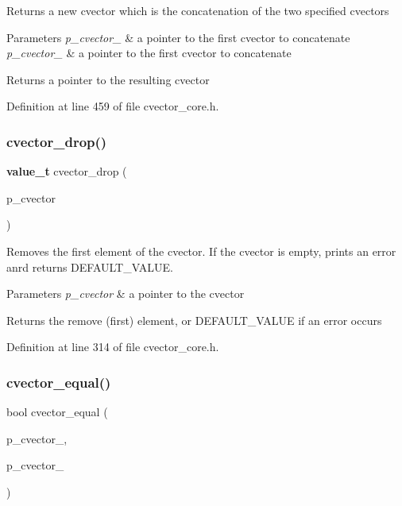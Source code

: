 Returns a new cvector which is the concatenation of the two specified cvectors 
\begin{DoxyParams}{Parameters}
{\em p\+\_\+cvector\+\_} & a pointer to the first cvector to concatenate \\
\hline
{\em p\+\_\+cvector\+\_} & a pointer to the first cvector to concatenate \\
\hline
\end{DoxyParams}
\begin{DoxyReturn}{Returns}
a pointer to the resulting cvector 
\end{DoxyReturn}


Definition at line 459 of file cvector\+\_\+core.\+h.

\mbox{\label{cvector__interface_8h_aa1f74a774799a6190e0f63e46fd034ad}} 
\subsubsection{cvector\+\_\+drop()}
{\footnotesize\ttfamily \textbf{ value\+\_\+t} cvector\+\_\+drop (\begin{DoxyParamCaption}\item[{\textbf{ cvector} $\ast$}]{p\+\_\+cvector }\end{DoxyParamCaption})}

Removes the first element of the cvector. If the cvector is empty, prints an error anrd returns D\+E\+F\+A\+U\+L\+T\+\_\+\+V\+A\+L\+UE. 
\begin{DoxyParams}{Parameters}
{\em p\+\_\+cvector} & a pointer to the cvector \\
\hline
\end{DoxyParams}
\begin{DoxyReturn}{Returns}
the remove (first) element, or D\+E\+F\+A\+U\+L\+T\+\_\+\+V\+A\+L\+UE if an error occurs 
\end{DoxyReturn}


Definition at line 314 of file cvector\+\_\+core.\+h.

\mbox{\label{cvector__interface_8h_aa0027f2467c3f04fb382dbec8cb6e33b}} 
\subsubsection{cvector\+\_\+equal()}
{\footnotesize\ttfamily bool cvector\+\_\+equal (\begin{DoxyParamCaption}\item[{\textbf{ cvector} $\ast$}]{p\+\_\+cvector\+\_,  }\item[{\textbf{ cvector} $\ast$}]{p\+\_\+cvector\+\_ }\end{DoxyParamCaption})}

